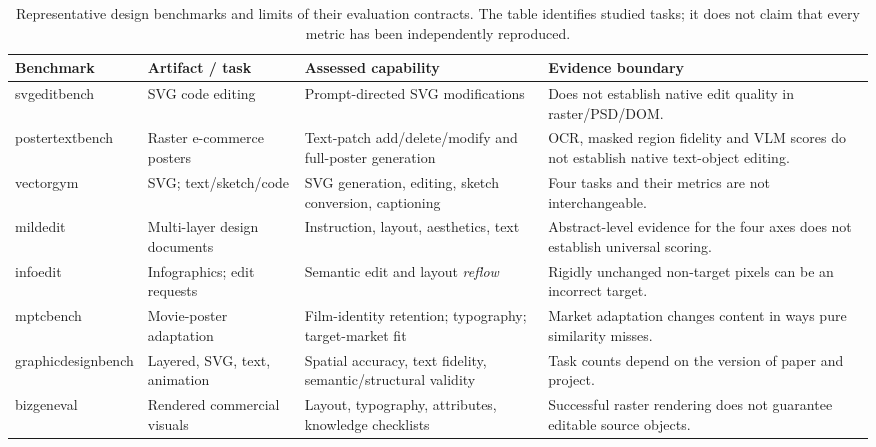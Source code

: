 \begin{table}[t]
\centering
\caption{Representative design benchmarks and limits of their evaluation contracts.
The table identifies studied tasks; it does not claim that every metric has been independently reproduced.}
\label{tab:benchmarks}
\footnotesize
\begin{tabularx}{\textwidth}{@{}p{}p{}p{}X@{}}
\toprule
\textbf{Benchmark} & \textbf{Artifact / task} & \textbf{Assessed capability} & \textbf{Evidence boundary}\\
\midrule
\ac{svgeditbench} \citep{svgeditbench2024} & SVG code editing & Prompt-directed SVG modifications & Does not establish native edit quality in raster/PSD/DOM.\\
\ac{postertextbench} \citep{postertext2026} & Raster e-commerce posters & Text-patch add/delete/modify and full-poster generation & OCR, masked region fidelity and VLM scores do not establish native text-object editing.\\
\ac{vectorgym} \citep{vectorgym2026} & SVG; text/sketch/code & SVG generation, editing, sketch conversion, captioning & Four tasks and their metrics are not interchangeable.\\
\ac{mildedit} \citep{mildedit2026} & Multi-layer design documents & Instruction, layout, aesthetics, text & Abstract-level evidence for the four axes does not establish universal scoring.\\
\ac{infoedit} \citep{yang2026infoedit} & Infographics; edit requests & Semantic edit and layout \emph{reflow} & Rigidly unchanged non-target pixels can be an incorrect target.\\
\ac{mptcbench} \citep{lin2026mptc} & Movie-poster adaptation & Film-identity retention; typography; target-market fit & Market adaptation changes content in ways pure similarity misses.\\
\ac{graphicdesignbench} \citep{deganutti2026gdb} & Layered, SVG, text, animation & Spatial accuracy, text fidelity, semantic/structural validity & Task counts depend on the version of paper and project.\\
\ac{bizgeneval} \citep{li2026bizgeneval} & Rendered commercial visuals & Layout, typography, attributes, knowledge checklists & Successful raster rendering does not guarantee editable source objects.\\

\end{tabularx}
\end{table}
